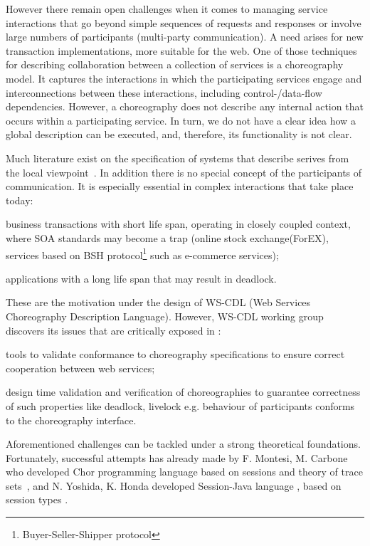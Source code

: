 \documentclass{llncs}
\begin{document}
However there remain open challenges when it comes to managing service interactions that go beyond simple sequences of requests and responses or involve large numbers of participants (multi-party communication). A need arises for new transaction implementations, more suitable for the web. One of those techniques for describing collaboration between a collection of services is a choreography model. It captures the interactions in which the participating services engage and interconnections between these interactions, including control-/data-flow dependencies. However, a choreography does not describe any internal action that occurs within a participating service. In turn, we do not have a clear idea how a global description can be executed, and, therefore, its functionality is not clear.

Much literature exist on the specification of systems that describe serives from the local viewpoint~\cite{cs-processes,alg-seq-processes}. In addition there is no special concept of the participants of communication. It is especially essential in complex interactions that take place today: 

	\begin{compactenum}
	   \item business transactions with short life span, operating in closely coupled context, where SOA standards may become a trap (online stock exchange(ForEX), services based on BSH protocol\footnote{Buyer-Seller-Shipper protocol} such as e-commerce services);
	   \item applications with a long life span that may result in deadlock.
	\end{compactenum}
These are the motivation under the design of WS-CDL (Web Services Choreography Description Language). However, WS-CDL working group discovers its issues that are critically exposed in \cite{ws-critical-overview}:
\begin{compactenum}
	\item tools to validate conformance to choreography specifications to ensure correct cooperation between web services;
	\item design time validation and verification of choreographies to guarantee correctness of such properties like deadlock, livelock e.g. behaviour of participants conforms to the choreography interface.
\end{compactenum}
Aforementioned challenges can be tackled under a strong theoretical foundations. Fortunately, successful attempts has already made by F. Montesi, M. Carbone who developed Chor programming language \cite{chor-lang,carbone2013deadlock} based on sessions and theory of trace sets~\cite{chor-essence}, and N. Yoshida, K. Honda developed Session-Java language \cite{sj-lang}, based on session types \cite{session-types-sessions,carbone2007structured}.
\end{document}
